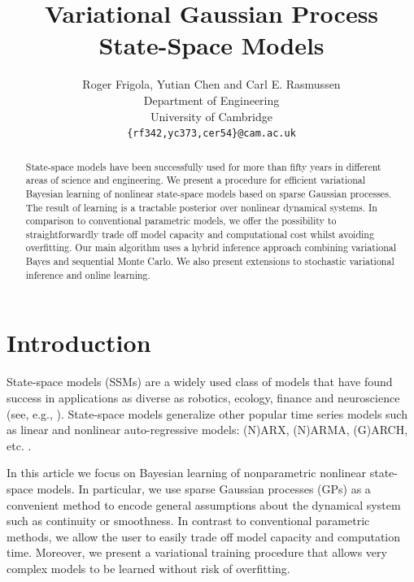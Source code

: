 \documentclass{article} %
\title{Variational Gaussian Process State-Space Models}
\author{
Roger Frigola, Yutian Chen and Carl E. Rasmussen \\
Department of Engineering\\
University of Cambridge \\
\texttt{\{rf342,yc373,cer54\}@cam.ac.uk} \\
}
\newcommand{\fix}{\marginpar{FIX}}
\begin{document}
\maketitle

\begin{abstract}

State-space models have been successfully used for more than fifty years in different areas of science and engineering. We present a procedure for efficient variational Bayesian learning of nonlinear state-space models based on sparse Gaussian processes. The result of learning is a tractable posterior over nonlinear dynamical systems. In comparison to conventional parametric models, we offer the possibility to straightforwardly trade off model capacity and computational cost whilst avoiding overfitting. Our main algorithm uses a hybrid inference approach combining variational Bayes and sequential Monte Carlo. We also present extensions to stochastic variational inference and online learning.

\end{abstract}




\section{Introduction}

State-space models (SSMs) are a widely used class of models that have found success in applications as diverse as robotics, ecology, finance and neuroscience (see, e.g., \citet{Brown1998}). State-space models generalize other popular time series models such as linear and nonlinear auto-regressive models: (N)ARX, (N)ARMA, (G)ARCH, etc. \citep{Shumway2011}.

In this article we focus on Bayesian learning of nonparametric nonlinear state-space models. In particular, we use sparse Gaussian processes (GPs) \citep{RasWil06} as a convenient method to encode general assumptions about the dynamical system such as continuity or smoothness. In contrast to conventional parametric methods, we allow the user to easily trade off model capacity and computation time. Moreover, we present a variational training procedure that allows very complex models to be learned without risk of overfitting. %
\end{document}
